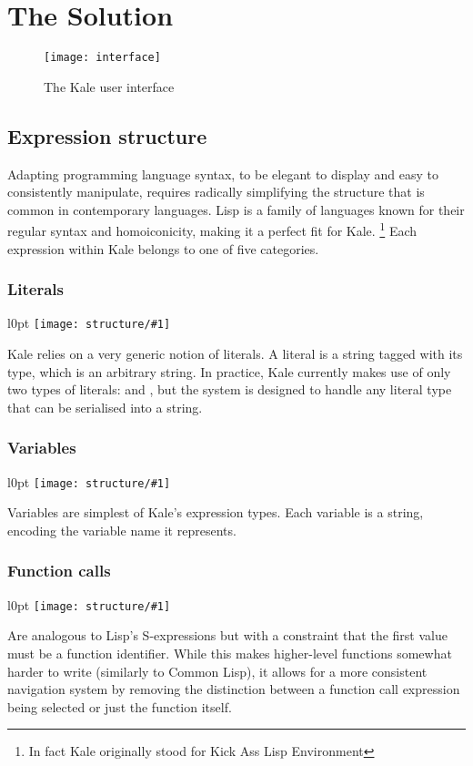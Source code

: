 \chapter{The Solution}

\begin{figure}[t]
\texttt{[image: interface]}
\caption{The Kale user interface}
\end{figure}


\section{Expression structure}

Adapting programming language syntax, to be elegant to display and easy to
consistently manipulate, requires radically simplifying the structure that is
common in contemporary languages. Lisp \citep{McCarthy1960} is a family of
languages known for their regular syntax and homoiconicity, making it a
perfect fit for Kale.%
\footnote{In fact Kale originally stood for Kick Ass Lisp Environment}
Each expression within Kale belongs to one of five categories.

\newcommand{\exprfig}[1]{
	\begin{wrapfigure}{l}{0pt}
    \texttt{[image: structure/\#1]}
	\end{wrapfigure}
}
\subsection{Literals}
\label{expr:literal}
\exprfig{literal}
Kale relies on a very generic notion of literals. A literal is a string
tagged with its type, which is an arbitrary string. In practice, Kale currently
makes use of only two types of literals:  and , but the
system is designed to handle any literal type that can be serialised into a
string.

\needspace{3cm}
\subsection{Variables}
\label{expr:variable}
\exprfig{variable}
Variables are simplest of Kale's expression types. Each variable is a string,
encoding the variable name it represents. 

\subsection{Function calls}
\label{expr:function}
\exprfig{function}
Are analogous to Lisp's S-expressions but with a constraint that the first
value must be a function identifier. While this makes higher-level functions
somewhat harder to write (similarly to Common Lisp), it allows for a more
consistent navigation system by removing the distinction between a function
call expression being selected or just the function itself.

